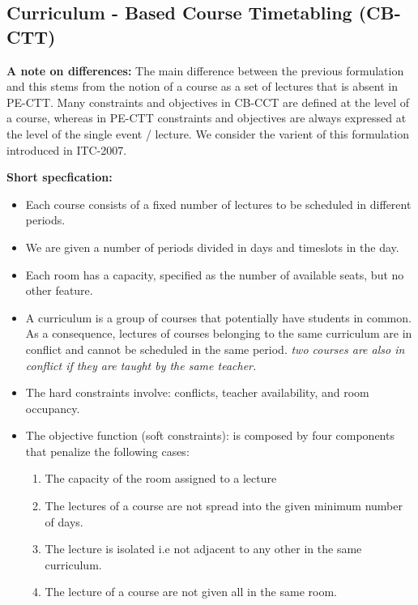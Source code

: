 \documentclass[11pt]{article}
\begin{document}
\subsection{Curriculum - Based Course Timetabling (CB-CTT)}
\textbf{A note on differences:} The main difference between the previous formulation and this stems from the notion of a course as a set of lectures that is absent in PE-CTT. Many constraints and objectives in CB-CCT are defined at the level of a course, whereas in PE-CTT constraints and objectives are always expressed at the level of the single event / lecture. We consider the varient of this formulation introduced in ITC-2007.

\textbf{Short specfication:}

\begin{itemize}

	\item Each course consists of a fixed number of lectures to be scheduled in different periods.
	\item We are given a number of periods divided in days and timeslots in the day. 
	\item Each room has a capacity, specified as the number of available seats, but no other feature. 
	\item A curriculum is a group of courses that potentially have students in common. As a consequence, lectures of courses belonging to the same curriculum are in conflict and cannot be scheduled in the same period. \textit{two courses are also in conflict if they are taught by the same teacher.}
	\item The hard constraints involve: conflicts, teacher availability, and room occupancy. 
	\item The objective function (soft constraints): is composed by four components that penalize the following cases:
		\begin{enumerate}
			\item The capacity of the room assigned to a lecture 
			\item The lectures of a course are not spread into the given minimum number of days. 
			\item The lecture is isolated i.e not adjacent to any  other in the same curriculum. 
			\item The lecture of a course are not given all in the same room.
		\end{enumerate}

\end{itemize}
\end{document}

